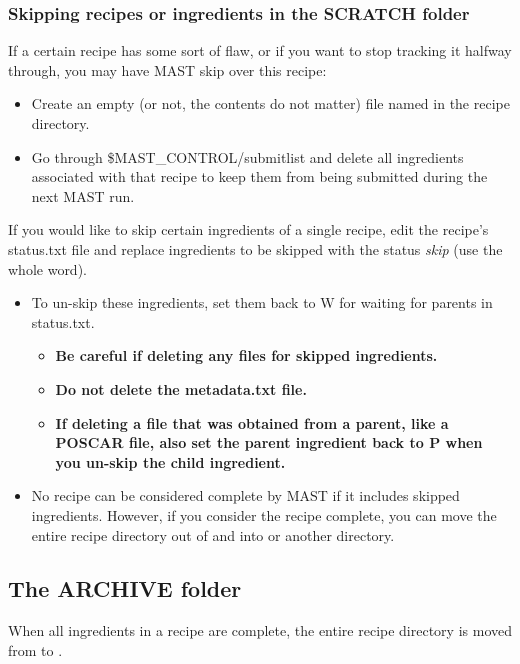 \documentclass[letterpaper,10pt,english]{sphinxmanual}
\begin{document}
\subsubsection{Skipping recipes or ingredients in the SCRATCH folder}
\label{5_0_runningmast:skipping-recipes-or-ingredients-in-the-scratch-folder}
If a certain recipe has some sort of flaw, or if you want to stop tracking it halfway through, you may have MAST skip over this recipe:
\begin{itemize}
\item {} 
Create an empty (or not, the contents do not matter) file named  in the recipe directory.

\item {} 
Go through \$MAST\_CONTROL/submitlist and delete all ingredients associated with that recipe to keep them from being submitted during the next MAST run.

\end{itemize}

If you would like to skip certain ingredients of a single recipe, edit the recipe's status.txt file and replace ingredients to be skipped with the status \emph{skip} (use the whole word).
\begin{itemize}
\item {} 
To un-skip these ingredients, set them back to W for waiting for parents in status.txt.
\begin{itemize}
\item {} 
\textbf{Be careful if deleting any files for skipped ingredients.}

\item {} 
\textbf{Do not delete the metadata.txt file.}

\item {} 
\textbf{If deleting a file that was obtained from a parent, like a POSCAR file, also set the parent ingredient back to P when you un-skip the child ingredient.}

\end{itemize}

\item {} 
No recipe can be considered complete by MAST if it includes skipped ingredients. However, if you consider the recipe complete, you can move the entire recipe directory out of  and into  or another directory.

\end{itemize}


\subsection{The ARCHIVE folder}
\label{5_0_runningmast:the-archive-folder}
When all ingredients in a recipe are complete, the entire recipe directory is moved from  to .
\end{document}
